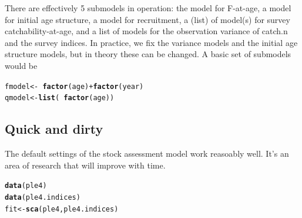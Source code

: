 \documentclass[a4paper,english,10pt]{article}\usepackage[]{graphicx}\usepackage[]{color}
\makeatletter
\newcommand{\hlopt}[1]{\textcolor[rgb]{0,0,0}{#1}}%
\newcommand{\hlstd}[1]{\textcolor[rgb]{0.345,0.345,0.345}{#1}}%
\newcommand{\hlkwb}[1]{\textcolor[rgb]{0.69,0.353,0.396}{#1}}%
\newcommand{\hlkwd}[1]{\textcolor[rgb]{0.737,0.353,0.396}{\textbf{#1}}}%
\newenvironment{kframe}{%
 \def\at@end@of@kframe{}%
 \ifinner\ifhmode%
  \def\at@end@of@kframe{\end{minipage}}%
  \begin{minipage}{\columnwidth}%
 \fi\fi%
 \def\FrameCommand##1{\hskip\@totalleftmargin \hskip-\fboxsep
 \colorbox{shadecolor}{##1}\hskip-\fboxsep
     \hskip-\linewidth \hskip-\@totalleftmargin \hskip\columnwidth}%
 \MakeFramed {\advance\hsize-\width
   \@totalleftmargin\z@ \linewidth\hsize
   \@setminipage}}%
 {\par\unskip\endMakeFramed%
 \at@end@of@kframe}
\newenvironment{knitrout}{}{} %
\makeatother
\begin{document}
There are effectively 5 submodels in operation: the model for F-at-age, a model for initial age structure, a model for recruitment, a (list) of model(s) for survey catchability-at-age, and a list of models for the observation variance of catch.n and the survey indices.  In practice, we fix the variance models and the initial age structure models, but in theory these can be changed.  A basic set of submodels would be

\begin{knitrout}
\color{fgcolor}\begin{kframe}
\begin{alltt}
\hlstd{fmodel} \hlkwb{<-} \hlopt{~}\hlkwd{factor}\hlstd{(age)} \hlopt{+} \hlkwd{factor}\hlstd{(year)}
\hlstd{qmodel} \hlkwb{<-} \hlkwd{list}\hlstd{(}\hlopt{~}\hlkwd{factor}\hlstd{(age))}
\end{alltt}
\end{kframe}
\end{knitrout}


\subsection{Quick and dirty}

The default settings of the stock assessment model work reasoably well. It's an area of research that will improve with time.

\begin{knitrout}
\color{fgcolor}\begin{kframe}
\begin{alltt}
\hlkwd{data}\hlstd{(ple4)}
\hlkwd{data}\hlstd{(ple4.indices)}
\hlstd{fit} \hlkwb{<-} \hlkwd{sca}\hlstd{(ple4, ple4.indices)}
\end{alltt}


{\ttfamily\noindent\itshape\color{messagecolor}{\#\# Note: The following observations are treated as being missing at random:\\\#\# 	\ \ \ \ \ \  fleet year age\\\#\# 	\ \ \ \ BTS-Isis 1997\ \  1\\\#\# 	\ \ \ \ BTS-Isis 1997\ \  2\\\#\# 	 BTS-Tridens 1997\ \  1\\\#\# 	 BTS-Tridens 1997\ \  2\\\#\# 	\ \ \ \ \ \ \ \  SNS 1997\ \  1\\\#\# 	\ \ \ \ \ \ \ \  SNS 1997\ \  2\\\#\# 	\ \ \ \ \ \ \ \  SNS 2003\ \  1\\\#\# 	\ \ \ \ \ \ \ \  SNS 2003\ \  2\\\#\# 	\ \ \ \ \ \ \ \  SNS 2003\ \  3\\\#\#\ \ \ \ \ \  Predictions will be made for missing observations.}}\end{kframe}
\end{knitrout}
\end{document}
